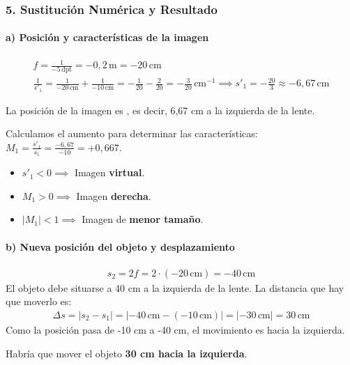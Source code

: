 \subsubsection*{5. Sustitución Numérica y Resultado}
\paragraph*{a) Posición y características de la imagen}
\begin{gather}
    f = \frac{1}{-5 \, \text{dpt}} = -0,2 \, \text{m} = -20 \, \text{cm} \\
    \frac{1}{s'_1} = \frac{1}{-20 \, \text{cm}} + \frac{1}{-10 \, \text{cm}} = -\frac{1}{20} - \frac{2}{20} = -\frac{3}{20} \, \text{cm}^{-1} \implies s'_1 = -\frac{20}{3} \approx -6,67 \, \text{cm}
\end{gather}
\begin{cajaresultado}
    La posición de la imagen es , es decir, 6,67 cm a la izquierda de la lente.
\end{cajaresultado}
Calculamos el aumento para determinar las características:
$M_1 = \frac{s'_1}{s_1} = \frac{-6,67}{-10} = +0,667$.
\begin{itemize}
    \item $s'_1 < 0 \implies$ Imagen \textbf{virtual}.
    \item $M_1 > 0 \implies$ Imagen \textbf{derecha}.
    \item $|M_1| < 1 \implies$ Imagen de \textbf{menor tamaño}.
\end{itemize}

\paragraph*{b) Nueva posición del objeto y desplazamiento}
\begin{gather}
    s_2 = 2f = 2 \cdot (-20 \, \text{cm}) = -40 \, \text{cm}
\end{gather}
El objeto debe situarse a 40 cm a la izquierda de la lente.
La distancia que hay que moverlo es:
\begin{gather}
    \Delta s = |s_2 - s_1| = |-40 \, \text{cm} - (-10 \, \text{cm})| = |-30 \, \text{cm}| = 30 \, \text{cm}
\end{gather}
Como la posición pasa de -10 cm a -40 cm, el movimiento es hacia la izquierda.
\begin{cajaresultado}
    Habría que mover el objeto \textbf{30 cm hacia la izquierda}.
\end{cajaresultado}

